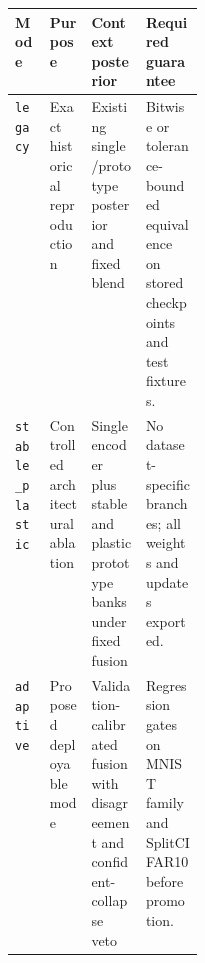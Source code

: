 \begin{tabularx}{\linewidth}{@{}l p{0.22\linewidth} X X@{}}
\toprule
Mode & Purpose & Context posterior & Required guarantee \\
\midrule
\texttt{legacy} & Exact historical reproduction & Existing single/prototype posterior and fixed blend & Bitwise or tolerance-bounded equivalence on stored checkpoints and test fixtures. \\
\texttt{stable\_plastic} & Controlled architectural ablation & Single encoder plus stable and plastic prototype banks under fixed fusion & No dataset-specific branches; all weights and updates exported. \\
\texttt{adaptive} & Proposed deployable mode & Validation-calibrated fusion with disagreement and confident-collapse veto & Regression gates on MNIST family and SplitCIFAR10 before promotion. \\
\bottomrule
\end{tabularx}
